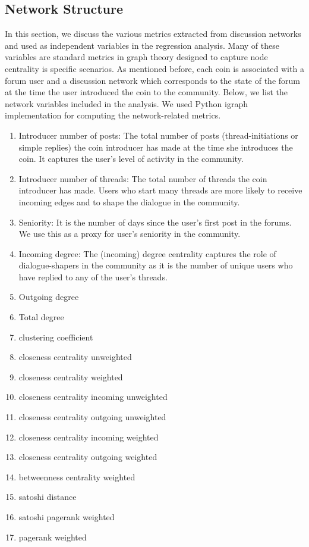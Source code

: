 \subsection{Network Structure}
In this section, we discuss the various metrics extracted from discussion networks and used as independent variables in the regression analysis. Many of these variables are standard metrics in graph theory designed to capture node centrality is specific scenarios. As mentioned before, each coin is associated with a forum user and a discussion network which corresponds to the state of the forum at the time the user introduced the coin to the community. Below, we list the network variables included in the analysis. We used Python igraph implementation for computing the network-related metrics.
\begin{enumerate}
  \item{Introducer number of posts:} The total number of posts (thread-initiations or simple replies) the coin introducer has made at the time she introduces the coin. It captures the user's level of activity in the community.
  \item{Introducer number of threads:} The total number of threads the coin introducer has made. Users who start many threads are more likely to receive incoming edges and to shape the dialogue in the community.
  \item{Seniority:} It is the number of days since the user's first post in the forums. We use this as a proxy for user's seniority in the community.
  \item{Incoming degree:} The (incoming) degree centrality captures the role of dialogue-shapers in the community as it is the number of unique users who have replied to any of the user's threads.
  \item{Outgoing degree}
  \item{Total degree}
  \item{clustering coefficient}
  \item{closeness centrality unweighted}
  \item{closeness centrality weighted}
  \item{closeness centrality incoming unweighted}
  \item{closeness centrality outgoing unweighted}
  \item{closeness centrality incoming weighted}
  \item{closeness centrality outgoing weighted}
  \item{betweenness centrality weighted}
  \item{satoshi distance}
  \item{satoshi pagerank weighted}
  \item{pagerank weighted}
\end{enumerate}
